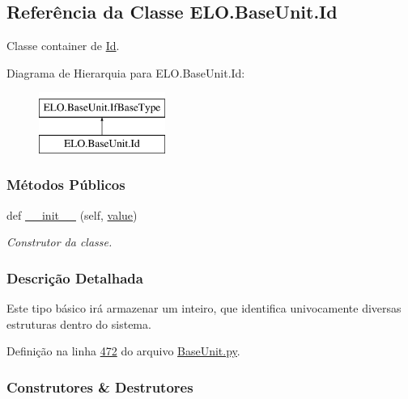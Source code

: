 \hypertarget{classELO_1_1BaseUnit_1_1Id}{}\subsection{Referência da Classe E\+L\+O.\+Base\+Unit.\+Id}
\label{classELO_1_1BaseUnit_1_1Id}


Classe container de \hyperlink{classELO_1_1BaseUnit_1_1Id}{Id}.  


Diagrama de Hierarquia para E\+L\+O.\+Base\+Unit.\+Id\+:\begin{figure}[H]
\begin{center}
\leavevmode
\includegraphics[height=2.000000cm]{d7/dca/classELO_1_1BaseUnit_1_1Id}
\end{center}
\end{figure}
\subsubsection*{Métodos Públicos}
\begin{DoxyCompactItemize}
\item 
def \hyperlink{classELO_1_1BaseUnit_1_1Id_a18230150421f9ecc584239526cd9acc9}{\+\_\+\+\_\+init\+\_\+\+\_\+} (self, \hyperlink{classELO_1_1BaseUnit_1_1IfBaseType_a2534c3548a8e5991dde0a64b4f0b542b}{value})
\begin{DoxyCompactList}\small\item\em Construtor da classe. \end{DoxyCompactList}\end{DoxyCompactItemize}


\subsubsection{Descrição Detalhada}
Este tipo básico irá armazenar um inteiro, que identifica univocamente diversas estruturas dentro do sistema. 

Definição na linha \hyperlink{BaseUnit_8py_source_l00472}{472} do arquivo \hyperlink{BaseUnit_8py_source}{Base\+Unit.\+py}.



\subsubsection{Construtores \& Destrutores}
\hypertarget{classELO_1_1BaseUnit_1_1Id_a18230150421f9ecc584239526cd9acc9}{}
